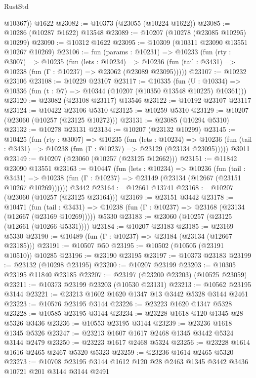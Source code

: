 \begin{lexlean}{RustStd}
\begin{coremodule}
        @10367))
    @1622
@23082 := @10373 (@23055 (@10224 @1622))
@23085 := @10286 (@10287 @1622) @13548
@23089 := @10207 (@10278 (@23085 @10295) @10299)
@23090 := @10312 @1622
@23095 := @10309 (@10311 @23090 @13551 @10267 @10269)
@23106 := fun (params : @10231) =>
  @10233
    (fun (rty : @3007) =>
    @10235
      (fun (lets : @10234) =>
      @10236 (fun (tail : @3431) => @10238 (fun (Γ : @10237) => @23062 (@23089 @23095)))))
@23107 := @10232 @23106
@23108 := @10229 @23107
@23117 := @10335
    (fun (U : @10334) => @10336 (fun (t : @7) => @10344 (@10207 (@10350 @13548 @10225) @10361)))
@23120 := @23082 (@23108 @23117) @13546
@23122 := @10192 @23107 @23117
@23124 := @10422 @23106 @5310
@23125 := @10259 @5310
@23129 := @10207 (@23060 (@10257 (@23125 @10272)))
@23131 := @23085 (@10294 @5310)
@23132 := @10278 @23131
@23134 := @10207 (@23132 @10299)
@23145 := @10425
    (fun (rty : @3007) =>
    @10235
      (fun (lets : @10234) =>
      @10236 (fun (tail : @3431) => @10238 (fun (Γ : @10237) => @23129 (@23134 @23095)))))
    @3011
@23149 := @10207 (@23060 (@10257 (@23125 @12662)))
@23151 := @11842 @23090 @13551
@23163 := @10447
    (fun (lets : @10234) =>
    @10236
      (fun (tail : @3431) =>
      @10238 (fun (Γ : @10237) => @23149 (@23134 (@12667 (@23151 @10267 @10269))))))
    @3442
@23164 := @12661 @13741
@23168 := @10207 (@23060 (@10257 (@23125 @23164)))
@23169 := @23151 @3442
@23178 := @10471
    (fun (tail : @3431) => @10238 (fun (Γ : @10237) => @23168 (@23134 (@12667 (@23169 @10269)))))
    @5330
@23183 := @23060 (@10257 (@23125 (@12661 (@10266 @5331))))
@23184 := @10207 @23183
@23185 := @23169 @5330
@23190 := @10489 (fun (Γ : @10237) => @23184 (@23134 (@12667 @23185)))
@23191 := @10507 @50
@23195 := @10502 (@10505 (@23191 @10510)) @10285
@23196 := @23190 @23195
@23197 := @10373 @23183
@23199 := @23132 (@10298 @23195)
@23200 := @10207 @23199
@23203 := @10305 @23195 @11840 @23185
@23207 := @23197 (@23200 @23203) (@10525 @23059)
@23211 := @10373 @23199 @23203 (@10530 @23131)
@23213 := @10562 @23195 @3144
@23221 := @23213 @1602 @1620 @1347 @13 @3442 @5328 @3144 @2461
@23223 := @10576 @23195 @3144
@23226 := @23223 @1620 @1347 @5328
@23228 := @10585 @23195 @3144
@23234 := @23228 @1618 @120 @1345 @28 @5326 @3436
@23236 := @10553 @23195 @3144
@23239 := @23236 @1618 @1345 @5326
@23247 := @23213 @1607 @1617 @2468 @1345 @3442 @5324 @3144 @2479
@23250 := @23223 @1617 @2468 @5324
@23256 := @23228 @1614 @1616 @2465 @2467 @5320 @5323
@23259 := @23236 @1614 @2465 @5320
@23273 := @10708 @23195 @3144 @1612 @120 @28 @2463 @1345 @3442 @3436 @10721 @201 @3144 @3144 @2491

\end{coremodule}
\end{lexlean}
